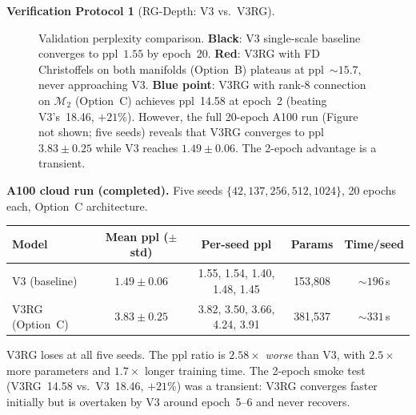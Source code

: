 \documentclass[11pt,a4paper]{article}
\theoremstyle{definition}
\newtheorem{protocol}[theorem]{Verification Protocol}
\theoremstyle{remark}
\begin{document}
\begin{protocol}[RG-Depth: V3 vs.\ V3RG]
\begin{figure}[ht]
\caption{Validation perplexity comparison. \textbf{Black}: V3 
single-scale baseline converges to ppl~$1.55$ by epoch~20. 
\textbf{Red}: V3RG with FD Christoffels on both manifolds 
(Option~B) plateaus at ppl~${\sim}15.7$, never approaching V3. 
\textbf{Blue point}: V3RG with rank-8 connection on 
$\mathcal{M}_2$ (Option~C) achieves ppl~14.58 at epoch~2 
(beating V3's~18.46, $+21\%$). However, the full 20-epoch A100 
run (Figure not shown; five seeds) reveals that V3RG converges to 
ppl~$3.83 \pm 0.25$ while V3 reaches $1.49 \pm 0.06$. The 
2-epoch advantage is a transient.}
\label{fig:ppl_comparison}
\end{figure}

\medskip
\textbf{A100 cloud run (completed).} Five seeds 
$\{42, 137, 256, 512, 1024\}$, 20 epochs each, Option~C 
architecture.

\begin{center}
\begin{tabular}{lcccc}
\toprule
\textbf{Model} & \textbf{Mean ppl ($\pm$ std)} 
& \textbf{Per-seed ppl} & \textbf{Params} & \textbf{Time/seed} \\
\midrule
V3 (baseline) & $\mathbf{1.49 \pm 0.06}$ & 
  1.55, 1.54, 1.40, 1.48, 1.45 & 153{,}808 & ${\sim}196\,$s \\
V3RG (Option~C) & $3.83 \pm 0.25$ & 
  3.82, 3.50, 3.66, 4.24, 3.91 & 381{,}537 & ${\sim}331\,$s \\
\bottomrule
\end{tabular}
\end{center}

V3RG loses at all five seeds. The ppl ratio is $2.58\times$ 
\emph{worse} than V3, with $2.5\times$ more parameters and 
$1.7\times$ longer training time. The 2-epoch smoke test 
(V3RG~14.58 vs.\ V3~18.46, $+21\%$) was a transient: V3RG 
converges faster initially but is overtaken by V3 around 
epoch~5--6 and never recovers.


\end{protocol}
\end{document}
